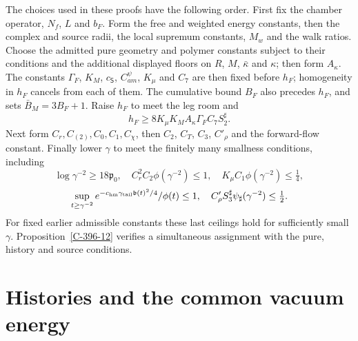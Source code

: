 \documentclass[11pt,letterpaper,reqno]{amsart}
\theoremstyle{definition}
\theoremstyle{remark}
\begin{document}
The choices used in these proofs have the following
order.  First fix the chamber operator, $N_f$, $L$
and $b_F$.  Form the free and weighted energy constants,
then the complex and source radii, the local supremum
constants, $M_w$ and the walk ratios.
Choose the admitted pure geometry and polymer constants
subject to their conditions and the additional displayed
floors on $R$, $M$, $\bar\kappa$ and $\kappa$;
then form $A_\kappa$.
The constants $\Gamma_F$, $K_M$, $c_{\mathsf S}$,
$C^\psi_{am}$, $K_\mu$ and $C_7$ are then fixed before
$h_F$; homogeneity in $h_F$ cancels from each of them.
The cumulative bound $B_F$ also precedes $h_F$, and
sets $\bar B_M=3B_F+1$.
Raise $h_F$ to meet the leg room and
\[
 h_F\ge8K_\mu K_MA_\kappa\Gamma_F C_7S_2^\sharp.
\]
Next form $C_r,C_{(2)},C_0,C_1,C_\chi$, then $C_2$,
$C_T$, $C_3$, $C'_\rho$ and the forward-flow constant.
Finally lower $\gamma$ to meet the finitely many
smallness conditions, including
\[
 \log\gamma^{-2}\ge18\mathfrak p_0,
 \quad C_r^2C_2\phi(\gamma^{-2})\le1,
 \quad K_\mu C_1\phi(\gamma^{-2})\le\tfrac14,
\]
\[
 \sup_{t\ge\gamma^{-2}}
   e^{-c_{\rm hm}\gamma_{\rm tail}\mathfrak b(t)^2/4}/\phi(t)
 \le1,
 \quad C'_\rho S_3^\sharp\psi_\sharp(\gamma^{-2})\le\tfrac12.
\]
For fixed earlier admissible constants these last
ceilings hold for sufficiently small $\gamma$.
Proposition~\ref{C-396-12} verifies a simultaneous assignment
with the pure, history and source conditions.


\section{Histories and the common vacuum energy}
\end{document}
